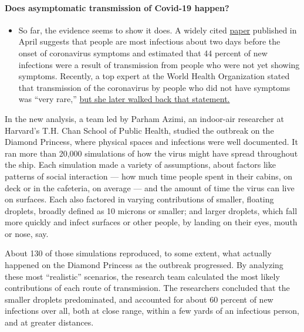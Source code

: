 \begin{itemize}
{  \paragraph{Does asymptomatic transmission of Covid-19
  happen?}\label{does-asymptomatic-transmission-of-covid-19-happen}}

  \begin{itemize}
  \tightlist
  \item
    So far, the evidence seems to show it does. A widely cited
    \href{https://www.nature.com/articles/s41591-020-0869-5}{paper}
    published in April suggests that people are most infectious about
    two days before the onset of coronavirus symptoms and estimated that
    44 percent of new infections were a result of transmission from
    people who were not yet showing symptoms. Recently, a top expert at
    the World Health Organization stated that transmission of the
    coronavirus by people who did not have symptoms was ``very rare,''
    \href{https://www.nytimes3xbfgragh.onion/2020/06/09/world/coronavirus-updates.html?action=click\&pgtype=Article\&state=default\&region=MAIN_CONTENT_3\&context=storylines_faq\#link-1f302e21}{but
    she later walked back that statement.}
  \end{itemize}
\end{itemize}

In the new analysis, a team led by Parham Azimi, an indoor-air
researcher at Harvard's T.H. Chan School of Public Health, studied the
outbreak on the Diamond Princess, where physical spaces and infections
were well documented. It ran more than 20,000 simulations of how the
virus might have spread throughout the ship. Each simulation made a
variety of assumptions, about factors like patterns of social
interaction --- how much time people spent in their cabins, on deck or
in the cafeteria, on average --- and the amount of time the virus can
live on surfaces. Each also factored in varying contributions of
smaller, floating droplets, broadly defined as 10 microns or smaller;
and larger droplets, which fall more quickly and infect surfaces or
other people, by landing on their eyes, mouth or nose, say.

About 130 of those simulations reproduced, to some extent, what actually
happened on the Diamond Princess as the outbreak progressed. By
analyzing these most ``realistic'' scenarios, the research team
calculated the most likely contributions of each route of transmission.
The researchers concluded that the smaller droplets predominated, and
accounted for about 60 percent of new infections over all, both at close
range, within a few yards of an infectious person, and at greater
distances.

